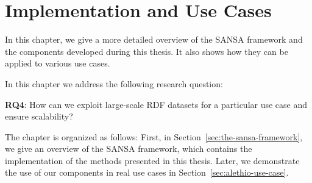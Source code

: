 \chapter{Implementation and Use Cases}
\label{chapter:implementation_and_use_cases}
In this chapter, we give a more detailed overview of the SANSA framework and the components developed during this thesis.
It also shows how they can be applied to various use cases.

In this chapter we address the following research question:

\begin{tcolorbox}
\textbf{RQ4}: How can we exploit large-scale \gls{RDF} datasets for a particular use case and ensure scalability?
\end{tcolorbox}

The chapter is organized as follows: First, in Section~\ref{sec:the-sansa-framework}, we give an overview of the SANSA framework, which contains the implementation of the methods presented in this thesis.
Later, we demonstrate the use of our components in real use cases in Section~\ref{sec:alethio-use-case}.

